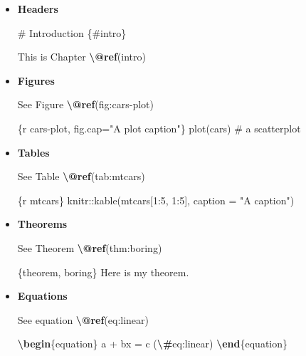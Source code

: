 \documentclass[
]{book}
\newenvironment{Shaded}{\begin{snugshade}}{\end{snugshade}}
\newcommand{\ExtensionTok}[1]{#1}
\newcommand{\FunctionTok}[1]{\textcolor[rgb]{0.13,0.29,0.53}{\textbf{#1}}}
\newcommand{\KeywordTok}[1]{\textcolor[rgb]{0.13,0.29,0.53}{\textbf{#1}}}
\newcommand{\NormalTok}[1]{#1}
\newcommand{\SpecialCharTok}[1]{\textcolor[rgb]{0.81,0.36,0.00}{\textbf{#1}}}
\newcommand{\SpecialStringTok}[1]{\textcolor[rgb]{0.31,0.60,0.02}{#1}}
\theoremstyle{definition}
\theoremstyle{definition}
\theoremstyle{definition}
\theoremstyle{definition}
\theoremstyle{remark}
\begin{document}
\begin{itemize}
\item
  \textbf{Headers}

\begin{Shaded}
\begin{Highlighting}[]
\NormalTok{\# Introduction \{\#intro\}}

\NormalTok{This is Chapter }\FunctionTok{\textbackslash{}@ref}\NormalTok{(intro)}
\end{Highlighting}
\end{Shaded}
\item
  \textbf{Figures}

\begin{Shaded}
\begin{Highlighting}[]
\NormalTok{See Figure }\FunctionTok{\textbackslash{}@ref}\NormalTok{(fig:cars{-}plot)}

\NormalTok{\textasciigrave{}\textasciigrave{}\textasciigrave{}\{r cars{-}plot, fig.cap="A plot caption"\}}
\NormalTok{plot(cars)  \# a scatterplot}
\NormalTok{\textasciigrave{}\textasciigrave{}\textasciigrave{}}
\end{Highlighting}
\end{Shaded}
\item
  \textbf{Tables}

\begin{Shaded}
\begin{Highlighting}[]
\NormalTok{See Table }\FunctionTok{\textbackslash{}@ref}\NormalTok{(tab:mtcars)}

\NormalTok{\textasciigrave{}\textasciigrave{}\textasciigrave{}\{r mtcars\}}
\NormalTok{knitr::kable(mtcars[1:5, 1:5], caption = "A caption")}
\NormalTok{\textasciigrave{}\textasciigrave{}\textasciigrave{}}
\end{Highlighting}
\end{Shaded}
\item
  \textbf{Theorems}

\begin{Shaded}
\begin{Highlighting}[]
\NormalTok{See Theorem }\FunctionTok{\textbackslash{}@ref}\NormalTok{(thm:boring)}

\NormalTok{\textasciigrave{}\textasciigrave{}\textasciigrave{}\{theorem, boring\}}
\NormalTok{Here is my theorem.}
\NormalTok{\textasciigrave{}\textasciigrave{}\textasciigrave{}}
\end{Highlighting}
\end{Shaded}
\item
  \textbf{Equations}

\begin{Shaded}
\begin{Highlighting}[]
\NormalTok{See equation }\FunctionTok{\textbackslash{}@ref}\NormalTok{(eq:linear)}

\KeywordTok{\textbackslash{}begin}\NormalTok{\{}\ExtensionTok{equation}\NormalTok{\}}
\SpecialStringTok{a + bx = c  (}\SpecialCharTok{\textbackslash{}\#}\SpecialStringTok{eq:linear)}
\KeywordTok{\textbackslash{}end}\NormalTok{\{}\ExtensionTok{equation}\NormalTok{\}}
\end{Highlighting}
\end{Shaded}
\end{itemize}
\end{document}

